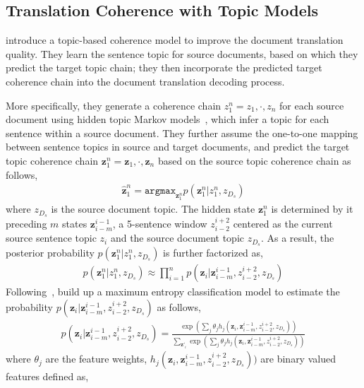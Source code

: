 \subsection{Translation Coherence with Topic Models}

\citet{xiong-13} introduce a topic-based coherence model to improve the document translation quality. They learn the sentence topic for source documents, based on which they predict the target topic chain; they then incorporate the predicted target coherence chain into the document translation decoding process.

More specifically, they generate a coherence chain $z_1^n = z_1, \cdot, z_n$ for each source document using hidden topic Markov models~\citep[HTMM]{gruber-07}, which infer a topic for each sentence within a source document. They further assume the one-to-one mapping between sentence topics in source and target documents, and predict the target topic coherence chain $\textbf{z}_1^n = \textbf{z}_1, \cdot, \textbf{z}_n$ based on the source topic coherence chain as follows,
\begin{align}
\hat{\textbf{z}}_1^n = \texttt{argmax}_{\textbf{z}_1^n} p (\textbf{z}_1^n | z_1^n, z_{D_s})
\end{align}
where $z_{D_s}$ is the source document topic. The hidden state $\textbf{z}_1^n$ is determined by it preceding $m$ states $\textbf{z}_{i-m}^{i-1}$, a 5-sentence window $z_{i-2}^{i+2}$ centered as the current source sentence topic $z_i$ and the source document topic $z_{D_s}$. As a result, the posterior probability $p (\textbf{z}_1^n | z_1^n, z_{D_s})$ is further factorized as,
\begin{align}
p (\textbf{z}_1^n | z_1^n, z_{D_s}) \approx \prod_{i=1}^n p(\textbf{z}_i | \textbf{z}_{i-m}^{i-1}, z_{i-2}^{i+2}, z_{D_s})
\end{align}
Following~\citet{Xiong-2006}, \citet{xiong-13} build up a maximum entropy classification model to estimate the probability $p(\textbf{z}_i | \textbf{z}_{i-m}^{i-1}, z_{i-2}^{i+2}, z_{D_s})$ as follows,
\begin{align}
p(\textbf{z}_i | \textbf{z}_{i-m}^{i-1}, z_{i-2}^{i+2}, z_{D_s}) = \frac{\exp(\sum_j \theta_j h_j(\textbf{z}_i, \textbf{z}_{i-m}^{i-1}, z_{i-2}^{i+2}, z_{D_s}))}{\sum_{\textbf{z}'_i} \exp(\sum_j \theta_j h_j(\textbf{z}_i, \textbf{z}_{i-m}^{i-1}, z_{i-2}^{i+2}, z_{D_s}))}
\end{align}
where $\theta_j$ are the feature weights, $ h_j(\textbf{z}_i, \textbf{z}_{i-m}^{i-1}, z_{i-2}^{i+2}, z_{D_s}))$ are binary valued features defined as, 
